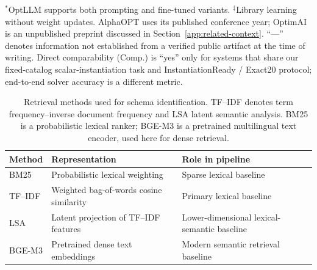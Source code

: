\documentclass[pdflatex,sn-basic,Numbered]{sn-jnl}
\begin{document}
\begin{table}[htbp]
\vspace{1mm}
\raggedright
\small
$^{*}$OptLLM supports both prompting and fine-tuned variants.
$^{\ddagger}$Library learning without weight updates.
AlphaOPT uses its published conference year; OptimAI is an unpublished preprint discussed in Section~\ref{app:related-context}.
``---'' denotes information not established from a verified public artifact at the time of writing.
Direct comparability (Comp.) is ``yes'' only for systems that share our fixed-catalog scalar-instantiation
task and InstantiationReady / Exact20 protocol; end-to-end solver accuracy is a different metric.
\end{table}
\begin{table}[htbp]
\centering
\caption{Retrieval methods used for schema identification. TF--IDF denotes term frequency--inverse document frequency and LSA latent semantic analysis. BM25 is a probabilistic lexical ranker; BGE-M3 is a pretrained multilingual text encoder, used here for dense retrieval.}
\label{tab:retrieval_backbones}
\small
\begin{tabularx}{\linewidth}{@{}lXX@{}}
\toprule
Method & Representation & Role in pipeline \\
\midrule
BM25 & Probabilistic lexical weighting & Sparse lexical baseline \\
TF--IDF & Weighted bag-of-words cosine similarity & Primary lexical baseline \\
LSA & Latent projection of TF--IDF features & Lower-dimensional lexical-semantic baseline \\
BGE-M3 & Pretrained dense text embeddings & Modern semantic retrieval baseline \\
\bottomrule
\end{tabularx}
\end{table}
\end{document}

